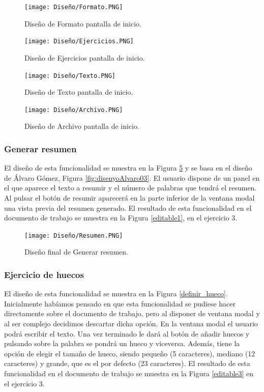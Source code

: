\begin{figure}[ht!]
  \centering
  \texttt{[image: Diseño/Formato.PNG]}
  \caption{Diseño de Formato pantalla de inicio.}
  \label{Forato}
\end{figure}

\begin{figure}[ht!]
  \centering
  \texttt{[image: Diseño/Ejercicios.PNG]}
  \caption{Diseño de Ejercicios pantalla de inicio.}
  \label{ejercicios}
\end{figure}

\begin{figure}[ht!]
  \centering
  \texttt{[image: Diseño/Texto.PNG]}
  \caption{Diseño de Texto pantalla de inicio.}
  \label{texto}
\end{figure}

\begin{figure}[ht!]
  \centering
  \texttt{[image: Diseño/Archivo.PNG]}
  \caption{Diseño de Archivo pantalla de inicio.}
  \label{archivo}
\end{figure}

\subsubsection{Generar resumen}
El diseño de esta funcionalidad se muestra en la Figura \ref{resuemn} y se basa en el diseño de Álvaro Gómez, Figura \ref{fig:disenyoAlvaro03}. El usuario dispone de un panel en el que aparece el texto a resumir y el número de palabras que tendrá el resumen. Al pulsar el botón de resumir aparecerá en la parte inferior de la ventana modal una vista previa del resumen generado. El resultado de esta funcionalidad en el documento de trabajo se muestra en la Figura \ref{editable1}, en el ejercicio 3.

\begin{figure}[ht!]
  \centering
  \texttt{[image: Diseño/Resumen.PNG]}
  \caption{Diseño final de Generar resumen.}
  \label{resuemn}
\end{figure}

\subsubsection{Ejercicio de huecos}
El diseño de esta funcionalidad se muestra en la Figura \ref{definir_hueco}. Inicialmente habíamos pensado en que esta funcionalidad se pudiese hacer directamente sobre el documento de trabajo, pero al disponer de ventana modal y al ser complejo decidimos descartar dicha opción. En la ventana modal el usuario podrá escribir el texto. Una vez terminado le dará al botón de añadir huecos y pulsando sobre la palabra se pondrá un hueco y viceversa. Además, tiene la opción de elegir el tamaño de hueco, siendo pequeño (5 caracteres), mediano (12 caracteres) y grande, que es el por defecto (23 caracteres). El resultado de esta funcionalidad en el documento de trabajo se muestra en la Figura \ref{editable3} en el ejercicio 3.

